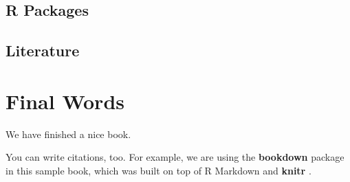 \documentclass[
]{book}
\begin{document}
\hypertarget{r-packages}{%
\section{R Packages}\label{r-packages}}

\hypertarget{literature}{%
\section{Literature}\label{literature}}

\hypertarget{final-words}{%
\chapter{Final Words}\label{final-words}}

We have finished a nice book.

You can write citations, too. For example, we are using the \textbf{bookdown} package \citep{R-bookdown} in this sample book, which was built on top of R Markdown and \textbf{knitr} \citep{xie2015}.

  
\end{document}
